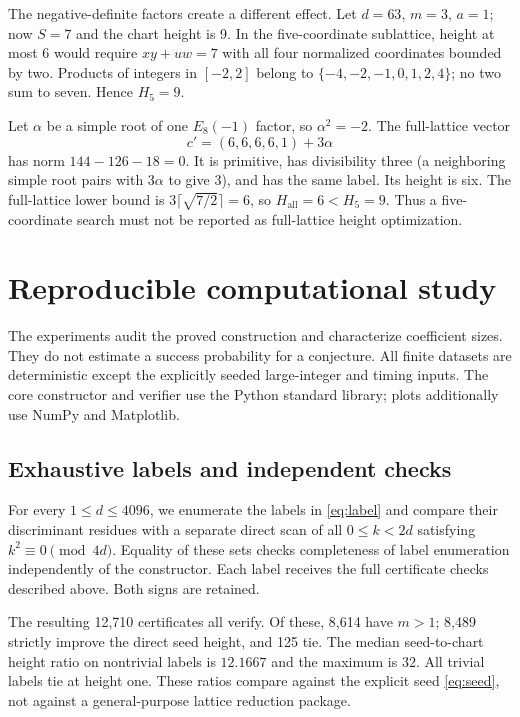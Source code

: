 \documentclass[11pt]{article}
\theoremstyle{remark}\newtheorem{remark}[theorem]{Remark}
\begin{document}
The negative-definite factors create a different effect. Let $d=63$, $m=3$, $a=1$; now $S=7$ and the chart height is 9. In the five-coordinate sublattice, height at most 6 would require $xy+uw=7$ with all four normalized coordinates bounded by two. Products of integers in $[-2,2]$ belong to $\{-4,-2,-1,0,1,2,4\}$; no two sum to seven. Hence $H_5=9$.

Let $\alpha$ be a simple root of one $E_8(-1)$ factor, so $\alpha^2=-2$. The full-lattice vector
\begin{equation}\label{eq:E8example}
 c'=(6,6,6,6,1)+3\alpha
\end{equation}
has norm $144-126-18=0$. It is primitive, has divisibility three (a neighboring simple root pairs with $3\alpha$ to give $3$), and has the same label. Its height is six. The full-lattice lower bound is $3\lceil\sqrt{7/2}\rceil=6$, so $H_{\mathrm{all}}=6<H_5=9$. Thus a five-coordinate search must not be reported as full-lattice height optimization.

\section{Reproducible computational study}
The experiments audit the proved construction and characterize coefficient sizes. They do not estimate a success probability for a conjecture. All finite datasets are deterministic except the explicitly seeded large-integer and timing inputs. The core constructor and verifier use the Python standard library; plots additionally use NumPy and Matplotlib.

\subsection{Exhaustive labels and independent checks}
For every $1\leq d\leq4096$, we enumerate the labels in \eqref{eq:label} and compare their discriminant residues with a separate direct scan of all $0\leq k<2d$ satisfying $k^2\equiv0\pmod{4d}$. Equality of these sets checks completeness of label enumeration independently of the constructor. Each label receives the full certificate checks described above. Both signs are retained.

The resulting 12,710 certificates all verify. Of these, 8,614 have $m>1$; 8,489 strictly improve the direct seed height, and 125 tie. The median seed-to-chart height ratio on nontrivial labels is $12.1667$ and the maximum is $32$. All trivial labels tie at height one. These ratios compare against the explicit seed \eqref{eq:seed}, not against a general-purpose lattice reduction package.
\end{document}
